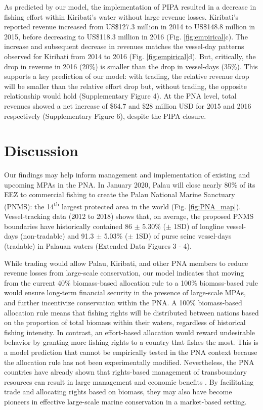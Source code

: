 \documentclass[12pt]{article}
\begin{document}
As predicted by our model, the implementation of PIPA resulted in a decrease in fishing effort within Kiribati's water without large revenue losses. Kiribati's reported revenue increased from US\$127.3 million in 2014 to US\$148.8 million in 2015, before decreasing to US\$118.3 million in 2016 (Fig. \ref{fig:empirical}c). The increase and subsequent decrease in revenues matches the vessel-day patterns observed for Kiribati from 2014 to 2016 (Fig. \ref{fig:empirical}d). But, critically, the drop in revenue in 2016 (20\%) is smaller than the drop in vessel-days (35\%). This supports a key prediction of our model: with trading, the relative revenue drop will be smaller than the relative effort drop but, without trading, the opposite relationship would hold (Supplementary Figure 4). At the PNA level, total revenues showed a net increase of \$64.7 and \$28 million USD for 2015 and 2016 respectively (Supplementary Figure 6), despite the PIPA closure.

\section{Discussion}

Our findings may help inform management and implementation of existing and upcoming MPAs in the PNA. In January 2020, Palau will close nearly 80\% of its EEZ to commercial fishing to create the Palau National Marine Sanctuary (PNMS): the 14\textsuperscript{th} largest protected area in the world (Fig. \ref{fig:PNA_map}). Vessel-tracking data (2012 to 2018) shows that, on average, the proposed PNMS boundaries have historically contained 86 $\pm$ 5.30\% ($\pm$ 1SD) of longline vessel-days (non-tradable) and 91.3 $\pm$ 5.03\% ($\pm$ 1SD) of purse seine vessel-days (tradable) in Palauan waters (Extended Data Figures 3 - 4).

While trading would allow Palau, Kiribati, and other PNA members to reduce revenue losses from large-scale conservation, our model indicates that moving from the current 40\% biomass-based allocation rule to a 100\% biomass-based rule would ensure long-term financial security in the presence of large-scale MPAs, and further incentivize conservation within the PNA. A 100\% biomass-based allocation rule means that fishing rights will be distributed between nations based on the proportion of total biomass within their waters, regardless of historical fishing intensity. In contrast, an effort-based allocation would reward undesirable behavior by granting more fishing rights to a country that fishes the most. This is a model prediction that cannot be empirically tested in the PNA context because the allocation rule has not been experimentally modified. Nevertheless, the PNA countries have already shown that rights-based management of transboundary resources can result in large management and economic benefits \cite{havice_2013,aqorau_2018}. By facilitating trade and allocating rights based on biomass, they may also have become pioneers in effective large-scale marine conservation in a market-based setting.
\end{document}
